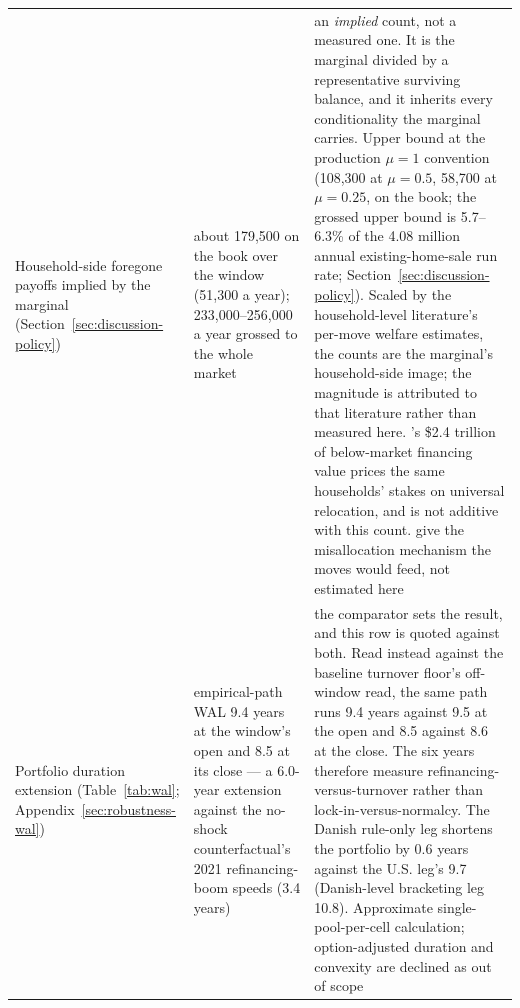 \documentclass[12pt]{article}
\begin{document}
{\begin{longtable}{@{}p{4.6cm}p{4.6cm}p{5.3cm}@{}}
\addlinespace
Household-side foregone payoffs implied by the marginal (Section~\ref{sec:discussion-policy}) & about 179{,}500 on the book over the window (51{,}300 a year); 233{,}000--256{,}000 a year grossed to the whole market & an \emph{implied} count, not a measured one. It is the marginal divided by a representative surviving balance, and it inherits every conditionality the marginal carries. Upper bound at the production $\mu = 1$ convention (108{,}300 at $\mu = 0.5$, 58{,}700 at $\mu = 0.25$, on the book; the grossed upper bound is 5.7--6.3\% of the 4.08 million annual existing-home-sale run rate; Section~\ref{sec:discussion-policy}). Scaled by the household-level literature's per-move welfare estimates, the counts are the marginal's household-side image; the magnitude is attributed to that literature \citep{gerardi2024} rather than measured here. \citet{batzer2024}'s \$2.4 trillion of below-market financing value prices the same households' stakes on universal relocation, and is not additive with this count. \citet{hsieh2019} give the misallocation mechanism the moves would feed, not estimated here \\
\addlinespace
Portfolio duration extension (Table~\ref{tab:wal}; Appendix~\ref{sec:robustness-wal}) & empirical-path WAL 9.4 years at the window's open and 8.5 at its close --- a 6.0-year extension against the no-shock counterfactual's 2021 refinancing-boom speeds (3.4 years) & the comparator sets the result, and this row is quoted against both. Read instead against the baseline turnover floor's off-window read, the same path runs 9.4 years against 9.5 at the open and 8.5 against 8.6 at the close. The six years therefore measure refinancing-versus-turnover rather than lock-in-versus-normalcy. The Danish rule-only leg shortens the portfolio by 0.6 years against the U.S. leg's 9.7 (Danish-level bracketing leg 10.8). Approximate single-pool-per-cell calculation; option-adjusted duration and convexity are declined as out of scope \\
\bottomrule
\end{longtable}
}

\end{document}
